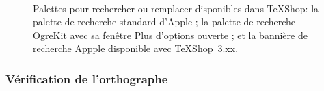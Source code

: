 \documentclass[11pt,french]{article}
\newcommand{\MacTeX}{Mac\kern-.12em\TeX}
\newcommand{\TS}{\textsf{\TeX Shop}}
\newcommand{\cmd}[1]{\textsf{#1}}
\begin{document}
\begin{figure}
\centering
{}%
\hfill%
%
\\[5pt]
\caption[Palettes de recherche/remplacement.]{Palettes pour rechercher ou remplacer disponibles dans \TS :
 la palette de recherche standard d'Apple ; %
 la palette de recherche OgreKit avec sa fenêtre \cmd{Plus d'options} ouverte ; et %
 la bannière de recherche Appple disponible avec \TS\ \cmd{3.xx}.} %
\label{FindPanels}
\end{figure}


\subsubsection{Vérification de l'orthographe}

%
\end{document}
